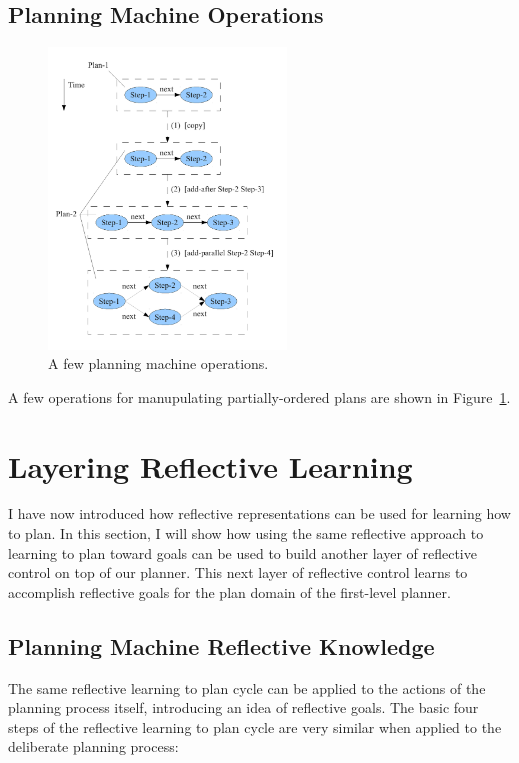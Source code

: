 \subsection{Planning Machine Operations}

\begin{figure}[bth]
  \center
  \includegraphics[height=8cm]{gfx/planning_machine_operations}
  \caption[A few planning machine operations]{A few planning machine operations.}
  \label{fig:planning_machine_operations}
\end{figure}

A few operations for manupulating partially-ordered plans are shown in
Figure~\ref{fig:planning_machine_operations}.


\section{Layering Reflective Learning}

I have now introduced how reflective representations can be used for
learning how to plan.  In this section, I will show how using the same
reflective approach to learning to plan toward goals can be used to
build another layer of reflective control on top of our planner.  This
next layer of reflective control learns to accomplish reflective goals
for the plan domain of the first-level planner.

\subsection{Planning Machine Reflective Knowledge}

The same reflective learning to plan cycle can be applied to the
actions of the planning process itself, introducing an idea of
reflective goals.  The basic four steps of the reflective learning to
plan cycle are very similar when applied to the deliberate planning
process:

